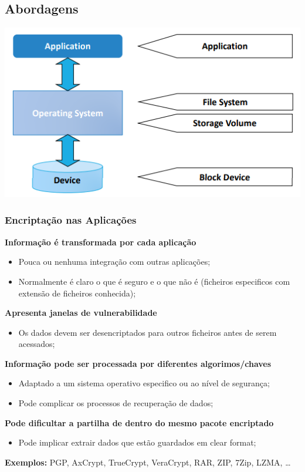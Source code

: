 \documentclass{article}
\begin{document}
\subsection{Abordagens}

\begin{center}
  \includegraphics[scale=0.6]{39}
\end{center}

\subsubsection{Encriptação nas Aplicações}

\begin{flushleft}
  \textbf{Informação é transformada por cada aplicação}
  \begin{itemize}
    \item Pouca ou nenhuma integração com outras aplicações;
    \item Normalmente é claro o que é seguro e o que não é (ficheiros
    especificos com extensão de ficheiros conhecida);
  \end{itemize}

  \textbf{Apresenta janelas de vulnerabilidade}
  \begin{itemize}
    \item Os dados devem ser desencriptados para outros ficheiros antes de serem acessados;
  \end{itemize}

  \textbf{Informação pode ser processada por diferentes algorimos/chaves}
  \begin{itemize}
    \item Adaptado a um sistema operativo especifico ou ao nível de segurança;
    \item Pode complicar os processos de recuperação de dados;
  \end{itemize}

  \textbf{Pode dificultar a partilha de  dentro do mesmo pacote encriptado}
  \begin{itemize}
    \item Pode implicar extrair dados que estão guardados em clear format;
  \end{itemize}

  \textbf{Exemplos:} PGP, AxCrypt, TrueCrypt, VeraCrypt, RAR, ZIP,
  7Zip, LZMA, \dots
\end{flushleft}
\end{document}
